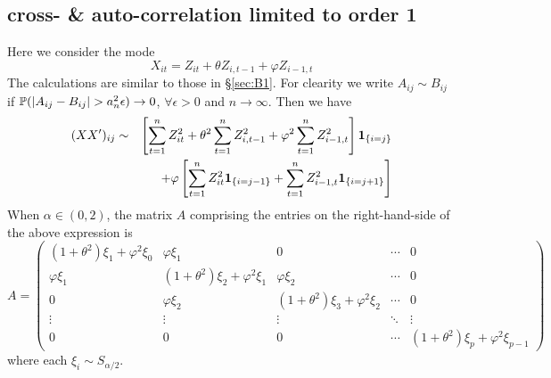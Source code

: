 \documentclass{article}
\begin{document}
\subsection{cross- \& auto-correlation limited to order 1}
Here we consider the mode
\[
X_{it} = Z_{it} + \theta Z_{i, t-1} + \varphi Z_{i-1, t}
\]
The calculations are similar to those in \S\ref{sec:B1}. For clearity
we write $A_{ij} \sim B_{ij}$ if $\mathbb{P}(|A_{ij} - B_{ij}| > a_n^2 \epsilon)
\to 0$, $\forall \epsilon > 0$ and $n \to \infty$. Then we have
\begin{eqnarray*}
  (XX')_{ij} &\sim& \left[
    \sum_{t=1}^n Z_{it}^2 + \theta^2 \sum_{t=1}^n Z_{i,t-1}^2 +
    \varphi^2 \sum_{t=1}^n Z_{i-1,t}^2 
  \right]\mathbf{1}_{\{i=j\}} \\
  && + \varphi \left[
    \sum_{t=1}^n Z_{it}^2 \mathbf{1}_{\{i=j-1\}} + \sum_{t=1}^n Z_{i-1, t}^2 \mathbf{1}_{\{i=j+1\}}
  \right]
\end{eqnarray*}
When $\alpha \in (0,2)$, the matrix $A$ comprising the entries on the
right-hand-side of the above expression is
\[
A =
\begin{pmatrix}
  (1 + \theta^2)\xi_1 + \varphi^2 \xi_0 & \varphi \xi_1 & 0 & \cdots & 0 \\
  \varphi \xi_1 & (1 + \theta^2)\xi_2 + \varphi^2 \xi_1 & \varphi \xi_2 & \cdots & 0 \\
  0 & \varphi \xi_2 & (1 + \theta^2)\xi_3 + \varphi^2 \xi_2 & \cdots & 0 \\
  \vdots & \vdots & \vdots & \ddots & \vdots \\
  0 & 0 & 0 & \cdots & (1 + \theta^2)\xi_p + \varphi^2 \xi_{p-1}
\end{pmatrix}
\]
where each $\xi_i \sim S_{\alpha/2}$.
\end{document}

